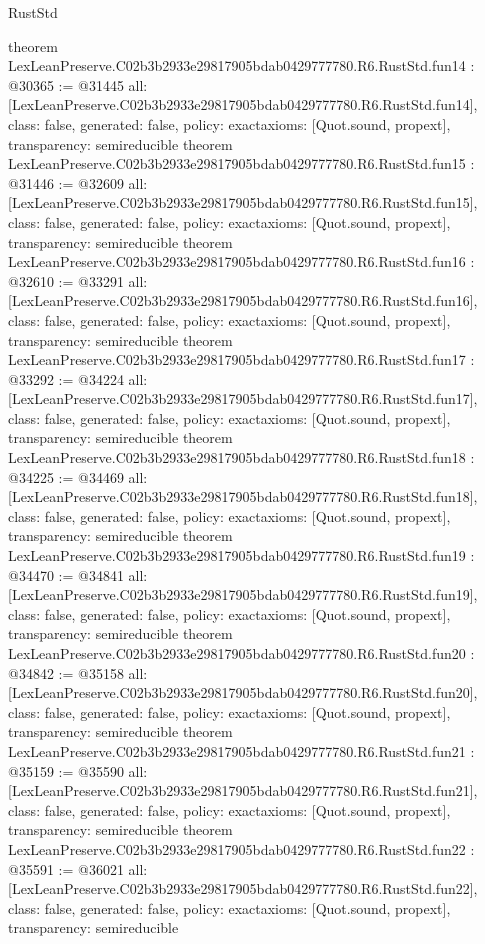 \begin{lexlean}{RustStd}
\begin{coremodule}
{}
theorem LexLeanPreserve.C02b3b2933e29817905bdab0429777780.R6.RustStd.fun14 : @30365 := @31445 {
  all: [LexLeanPreserve.C02b3b2933e29817905bdab0429777780.R6.RustStd.fun14],
  class: false,
  generated: false,
  policy: exact{axioms: [Quot.sound, propext]},
  transparency: semireducible
}
theorem LexLeanPreserve.C02b3b2933e29817905bdab0429777780.R6.RustStd.fun15 : @31446 := @32609 {
  all: [LexLeanPreserve.C02b3b2933e29817905bdab0429777780.R6.RustStd.fun15],
  class: false,
  generated: false,
  policy: exact{axioms: [Quot.sound, propext]},
  transparency: semireducible
}
theorem LexLeanPreserve.C02b3b2933e29817905bdab0429777780.R6.RustStd.fun16 : @32610 := @33291 {
  all: [LexLeanPreserve.C02b3b2933e29817905bdab0429777780.R6.RustStd.fun16],
  class: false,
  generated: false,
  policy: exact{axioms: [Quot.sound, propext]},
  transparency: semireducible
}
theorem LexLeanPreserve.C02b3b2933e29817905bdab0429777780.R6.RustStd.fun17 : @33292 := @34224 {
  all: [LexLeanPreserve.C02b3b2933e29817905bdab0429777780.R6.RustStd.fun17],
  class: false,
  generated: false,
  policy: exact{axioms: [Quot.sound, propext]},
  transparency: semireducible
}
theorem LexLeanPreserve.C02b3b2933e29817905bdab0429777780.R6.RustStd.fun18 : @34225 := @34469 {
  all: [LexLeanPreserve.C02b3b2933e29817905bdab0429777780.R6.RustStd.fun18],
  class: false,
  generated: false,
  policy: exact{axioms: [Quot.sound, propext]},
  transparency: semireducible
}
theorem LexLeanPreserve.C02b3b2933e29817905bdab0429777780.R6.RustStd.fun19 : @34470 := @34841 {
  all: [LexLeanPreserve.C02b3b2933e29817905bdab0429777780.R6.RustStd.fun19],
  class: false,
  generated: false,
  policy: exact{axioms: [Quot.sound, propext]},
  transparency: semireducible
}
theorem LexLeanPreserve.C02b3b2933e29817905bdab0429777780.R6.RustStd.fun20 : @34842 := @35158 {
  all: [LexLeanPreserve.C02b3b2933e29817905bdab0429777780.R6.RustStd.fun20],
  class: false,
  generated: false,
  policy: exact{axioms: [Quot.sound, propext]},
  transparency: semireducible
}
theorem LexLeanPreserve.C02b3b2933e29817905bdab0429777780.R6.RustStd.fun21 : @35159 := @35590 {
  all: [LexLeanPreserve.C02b3b2933e29817905bdab0429777780.R6.RustStd.fun21],
  class: false,
  generated: false,
  policy: exact{axioms: [Quot.sound, propext]},
  transparency: semireducible
}
theorem LexLeanPreserve.C02b3b2933e29817905bdab0429777780.R6.RustStd.fun22 : @35591 := @36021 {
  all: [LexLeanPreserve.C02b3b2933e29817905bdab0429777780.R6.RustStd.fun22],
  class: false,
  generated: false,
  policy: exact{axioms: [Quot.sound, propext]},
  transparency: semireducible
}
\end{coremodule}
\end{lexlean}
